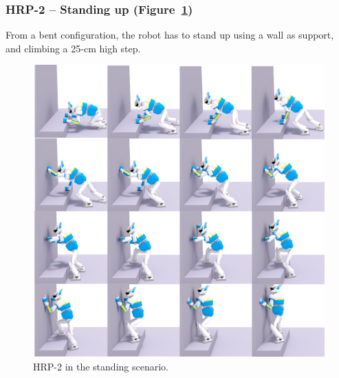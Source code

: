 
\subsubsection{HRP-2 -- Standing up (Figure~\ref{fig:standing})}
From a bent configuration, the robot has to stand up using a wall as support, and climbing a 25-cm high step.

\begin{figure}
  \centering
  \includegraphics[width=1\linewidth]{figures/standing}
  \caption{
           HRP-2 in the standing scenario. }
		   \label{fig:standing}
\end{figure}


